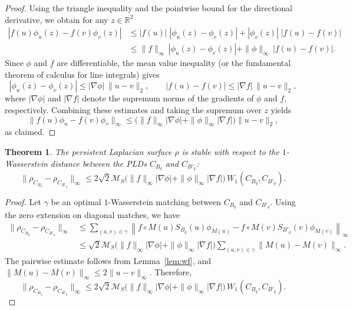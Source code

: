 \documentclass{article}
\newtheorem{theorem}{Theorem}[section]
\begin{document}
\begin{proof}
Using the triangle inequality and the pointwise bound for the directional derivative, we obtain for any $z\in\mathbb{R}^2$
\begin{align*}
    |f(u)\phi_u(z)-f(v)\phi_v(z)|
    &\le |f(u)|\;|\phi_u(z)-\phi_v(z)|+|\phi_v(z)|\;|f(u)-f(v)| \\
    &\le \|f\|_{\infty}\,|\phi_u(z)-\phi_v(z)|+\|\phi\|_{\infty}\,|f(u)-f(v)|.
\end{align*}
Since $\phi$ and $f$ are differentiable, the mean value inequality (or the fundamental theorem of calculus for line integrals) gives
\[
|\phi_u(z)-\phi_v(z)| \le |\nabla\phi|\,\|u-v\|_2,\qquad
|f(u)-f(v)| \le |\nabla f|\,\|u-v\|_2,
\]
where $|\nabla\phi|$ and $|\nabla f|$ denote the supremum norms of the gradients of $\phi$ and $f$, respectively. Combining these estimates and taking the supremum over $z$ yields
\[
\|f(u)\phi_u-f(v)\phi_v\|_{\infty}
\le \big(\|f\|_{\infty}|\nabla\phi|+\|\phi\|_{\infty}|\nabla f|\big)\|u-v\|_2,
\]
as claimed.
\end{proof}


\begin{theorem}\label{thm:pls}
The persistent Laplacian surface \( \rho \) is stable with respect to the \( 1 \)-Wasserstein distance between the PLDs $C_{B_q}$ and $C_{B'_q}$:
\[
\|\rho_{C_{B_q}}-\rho_{C_{B'_q}}\|_{\infty}
\le 2\sqrt{2}\mathcal M_S\big(\|f\|_{\infty}|\nabla\phi|+\|\phi\|_{\infty}|\nabla f|\big)\,W_1(C_{B_q},C_{B'_q}).
\]
\end{theorem}

\begin{proof}
Let $\gamma$ be an optimal $1$-Wasserstein matching between $C_{B_q}$ and $C_{B'_q}$. Using the zero extension on diagonal matches, we have
    \begin{align*}
    \|\rho_{C_{B_q}}-\rho_{C_{B'_q}}\|_{\infty}
    &\le \sum_{(u,v)\in\gamma}
    \left\|f\circ M(u)S_{B_q}(u)\phi_{M(u)}
    -f\circ M(v)S_{B'_q}(v)\phi_{M(v)}\right\|_\infty\\
    &\le \sqrt{2}\mathcal M_S
    \big(\|f\|_{\infty}|\nabla\phi|+\|\phi\|_{\infty}|\nabla f|\big)
    \sum_{(u,v)\in\gamma}\|M(u)-M(v)\|_\infty.
    \end{align*}
The pairwise estimate follows from Lemma~\ref{lem:wf}, and
$\|M(u)-M(v)\|_{\infty}\le 2\|u-v\|_{\infty}$. Therefore,
\[
\|\rho_{C_{B_q}}-\rho_{C_{B'_q}}\|_{\infty}
\le 2\sqrt{2}\mathcal M_S\big(\|f\|_{\infty}|\nabla\phi|+\|\phi\|_{\infty}|\nabla f|\big)\,W_1(C_{B_q},C_{B'_q}).
\]
\end{proof}
\end{document}
